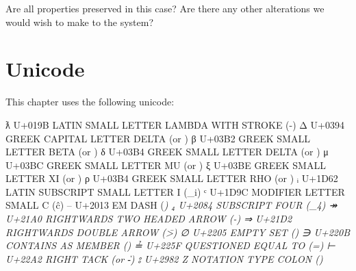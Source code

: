 Are all properties preserved in this case? Are there any other
alterations we would wish to make to the system?

\hypertarget{unicode}{%
\section{Unicode}\label{unicode}}

This chapter uses the following unicode:

\begin{myDisplay}
ƛ  U+019B  LATIN SMALL LETTER LAMBDA WITH STROKE (\Gl-)
Δ  U+0394  GREEK CAPITAL LETTER DELTA (\GD or \Delta)
β  U+03B2  GREEK SMALL LETTER BETA (\Gb or \beta)
δ  U+03B4  GREEK SMALL LETTER DELTA (\Gd or \delta)
μ  U+03BC  GREEK SMALL LETTER MU (\Gm or \mu)
ξ  U+03BE  GREEK SMALL LETTER XI (\Gx or \xi)
ρ  U+03B4  GREEK SMALL LETTER RHO (\Gr or \rho)
ᵢ  U+1D62  LATIN SUBSCRIPT SMALL LETTER I (\_i)
ᶜ  U+1D9C  MODIFIER LETTER SMALL C (\^c)
–  U+2013  EM DASH (\em)
₄  U+2084  SUBSCRIPT FOUR (\_4)
↠  U+21A0  RIGHTWARDS TWO HEADED ARROW (\rr-)
⇒  U+21D2  RIGHTWARDS DOUBLE ARROW (\=>)
∅  U+2205  EMPTY SET (\0)
∋  U+220B  CONTAINS AS MEMBER (\ni)
≟  U+225F  QUESTIONED EQUAL TO (\?=)
⊢  U+22A2  RIGHT TACK (\vdash or \|-)
⦂  U+2982  Z NOTATION TYPE COLON (\:)
\end{myDisplay}

